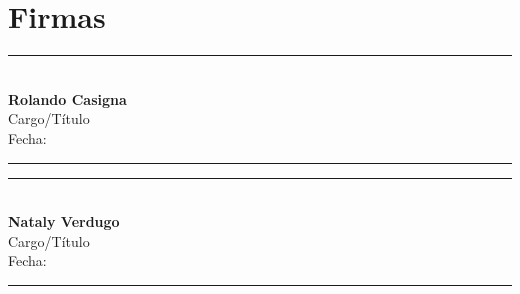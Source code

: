 \section{Firmas}

\vspace{2cm}

\begin{minipage}{0.45\textwidth}
    \centering
    \rule{6cm}{0.5pt}\\
    \vspace{0.3cm}
    \textbf{Rolando Casigna}\\
    Cargo/Título\\
    Fecha: \rule{3cm}{0.5pt}
\end{minipage}
\hfill
\begin{minipage}{0.45\textwidth}
    \centering
    \rule{6cm}{0.5pt}\\
    \vspace{0.3cm}
    \textbf{Nataly Verdugo}\\
    Cargo/Título\\
    Fecha: \rule{3cm}{0.5pt}
\end{minipage}

\vspace{2cm}